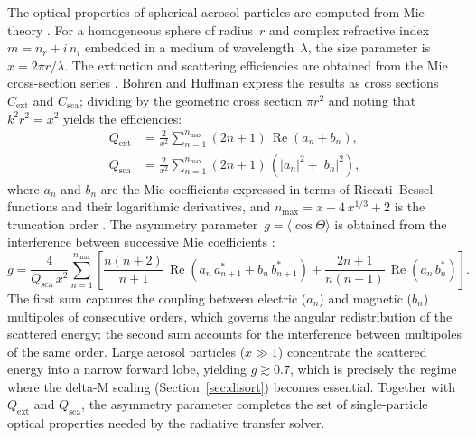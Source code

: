 \documentclass[a4paper, 11pt]{article}
\begin{document}
The optical properties of spherical aerosol particles are computed from
Mie theory \cite{bohren1983,vandeHulst1957}.  For a homogeneous sphere
of radius~$r$ and complex refractive index $m = n_r + i\,n_i$
embedded in a medium of wavelength~$\lambda$, the size parameter is
$x = 2\pi r / \lambda$.  The extinction and scattering efficiencies
are obtained from the Mie cross-section series
\cite[Eqs.~4.61--4.62]{bohren1983}.  Bohren and Huffman express the
results as cross sections $C_{\text{ext}}$ and $C_{\text{sca}}$;
dividing by the geometric cross section $\pi r^2$ and noting that
$k^2 r^2 = x^2$ yields the efficiencies:
%
\begin{align}
  Q_{\text{ext}} &= \frac{2}{x^2}\sum_{n=1}^{n_{\max}}
  (2n+1)\,\operatorname{Re}(a_n + b_n), \label{eq:qext}\\[4pt]
  Q_{\text{sca}} &= \frac{2}{x^2}\sum_{n=1}^{n_{\max}}
  (2n+1)\,(|a_n|^2 + |b_n|^2), \label{eq:qsca}
\end{align}
%
where $a_n$ and $b_n$ are the Mie coefficients expressed in terms of
Riccati--Bessel functions and their logarithmic derivatives, and
$n_{\max} = x + 4\,x^{1/3} + 2$ is the truncation order
\cite{wiscombe1980}.  The asymmetry parameter~$g = \langle\cos\Theta\rangle$
is obtained from the interference between successive Mie coefficients
\cite[Eq.~4.70]{bohren1983}:
%
\begin{equation}
  g = \frac{4}{Q_{\text{sca}}\,x^2}\sum_{n=1}^{n_{\max}}
  \left[\frac{n(n+2)}{n+1}\,
  \operatorname{Re}(a_n\,a_{n+1}^* + b_n\,b_{n+1}^*)
  + \frac{2n+1}{n(n+1)}\,\operatorname{Re}(a_n\,b_n^*)\right].
  \label{eq:g_mie}
\end{equation}
%
The first sum captures the coupling between electric ($a_n$) and
magnetic ($b_n$) multipoles of consecutive orders, which governs the
angular redistribution of the scattered energy; the second sum accounts
for the interference between multipoles of the same order.
Large aerosol particles ($x \gg 1$) concentrate the scattered energy
into a narrow forward lobe, yielding $g \gtrsim 0.7$, which is
precisely the regime where the delta-M scaling
(Section~\ref{sec:disort}) becomes essential.  Together with
$Q_{\text{ext}}$ and $Q_{\text{sca}}$, the asymmetry parameter
completes the set of single-particle optical properties needed by the
radiative transfer solver.
\end{document}

